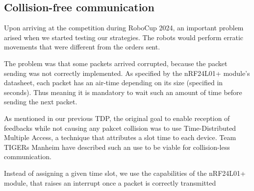 \subsection{Collision-free communication}
Upon arriving at the competition during RoboCup 2024, an important problem
arised when we started testing our strategies. The robots would perform erratic
movements that were different from the orders sent.

The problem was that some packets arrived corrupted, because the packet
sending was not correctly implemented. As specified by the nRF24L01+ module's
datasheet, each packet has an air-time depending on its size (specified in seconds).
Thus meaning it is mandatory to wait such an amount of time before sending the next
packet.

As mentioned in our previous TDP, the original goal to enable reception of feedbacks while not causing any 
pakcet collision was to use Time-Distributed Multiple Access, a technique that
attributes a slot time to each device. Team TIGERs Manheim have described such an use \cite{tigers_tdp_2020}
to be viable for collision-less communication.

Instead of assigning a given time slot, we use the capabilities of the nRF24L01+ module,
that raises an interrupt once a packet is correctly transmitted